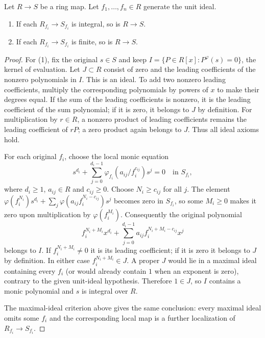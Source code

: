 \begin{lemma}
\label{editorial-source-lemma-integral-local}
Let $R \to S$ be a ring map.
Let $f_1, \ldots, f_n \in R$ generate the unit ideal.
\begin{enumerate}
\item If each $R_{f_i} \to S_{f_i}$ is integral, so is $R \to S$.
\item If each $R_{f_i} \to S_{f_i}$ is finite, so is $R \to S$.
\end{enumerate}
\end{lemma}

\begin{proof}
For (1), fix the original $s\in S$ and keep
$I=\{P\in R[x]:P^\varphi(s)=0\}$, the kernel of evaluation.
Let $J\subset R$ consist of zero and the leading coefficients
of the nonzero polynomials in $I$. This is an ideal. To add two
nonzero leading coefficients, multiply the corresponding polynomials
by powers of $x$ to make their degrees equal. If the sum of the
leading coefficients is nonzero, it is the leading coefficient of
the sum polynomial; if it is zero, it belongs to $J$ by definition.
For multiplication by $r\in R$, a nonzero product of leading
coefficients remains the leading coefficient of $rP$; a zero
product again belongs to $J$. Thus all ideal axioms hold.

For each original $f_i$, choose the local monic equation
$$
s^{d_i}+\sum_{j=0}^{d_i-1}
\varphi_{f_i}(a_{ij}/f_i^{c_{ij}})s^j=0
\quad\text{in }S_{f_i},
$$
where $d_i\geq1$, $a_{ij}\in R$ and $c_{ij}\geq0$.
Choose $N_i\geq c_{ij}$ for all $j$. The element
$\varphi(f_i^{N_i})s^{d_i}+
\sum_j\varphi(a_{ij}f_i^{N_i-c_{ij}})s^j$ becomes zero in
$S_{f_i}$, so some $M_i\geq0$ makes it zero upon multiplication
by $\varphi(f_i^{M_i})$. Consequently the original polynomial
$$
f_i^{N_i+M_i}x^{d_i}
+\sum_{j=0}^{d_i-1}a_{ij}f_i^{N_i+M_i-c_{ij}}x^j
$$
belongs to $I$. If $f_i^{N_i+M_i}\ne0$ it is its leading
coefficient; if it is zero it belongs to $J$ by definition.
In either case $f_i^{N_i+M_i}\in J$. A proper $J$ would lie
in a maximal ideal containing every $f_i$ (or would already
contain $1$ when an exponent is zero), contrary to the given
unit-ideal hypothesis. Therefore $1\in J$, so $I$ contains a
monic polynomial and $s$ is integral over $R$.

The maximal-ideal criterion above gives the same conclusion:
every maximal ideal omits some $f_i$ and the corresponding local
map is a further localization of $R_{f_i}\to S_{f_i}$.


\end{proof}
